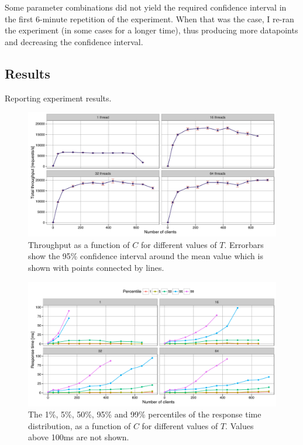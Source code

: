 \documentclass[11pt]{article}
\begin{document}
Some parameter combinations did not yield the required confidence interval in the first 6-minute repetition of the experiment. When that was the case, I re-ran the experiment (in some cases for a longer time), thus producing more datapoints and decreasing the confidence interval.

\subsection{Results}
Reporting experiment results.

\begin{figure}[h!]
\centering
\includegraphics[width=\textwidth]{../results/throughput/graphs/tp_vs_clients.pdf}
\caption{Throughput as a function of $C$ for different values of $T$. Errorbars show the 95\% confidence interval around the mean value which is shown with points connected by lines.}
\label{fig:exp1:res:throughput}
\end{figure}

\begin{figure}[h!]
\centering
\includegraphics[width=\textwidth]{../results/throughput/graphs/response_time_vs_clients.pdf}
\caption{The 1\%, 5\%, 50\%, 95\% and 99\% percentiles of the response time distribution, as a function of $C$ for different values of $T$. Values above 100ms are not shown.}
\label{fig:exp1:res:responsetime}
\end{figure}
\end{document}
